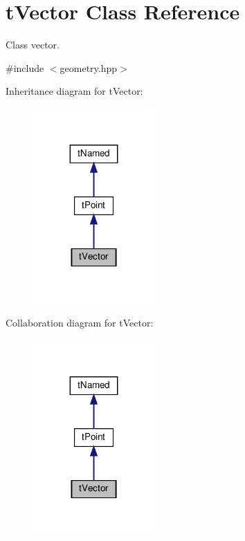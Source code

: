 \hypertarget{classtVector}{}\section{t\+Vector Class Reference}
\label{classtVector}


Class vector.  




{\ttfamily \#include $<$geometry.\+hpp$>$}



Inheritance diagram for t\+Vector\+:
\nopagebreak
\begin{figure}[H]
\begin{center}
\leavevmode
\includegraphics[width=131pt]{classtVector__inherit__graph}
\end{center}
\end{figure}


Collaboration diagram for t\+Vector\+:
\nopagebreak
\begin{figure}[H]
\begin{center}
\leavevmode
\includegraphics[width=131pt]{classtVector__coll__graph}
\end{center}
\end{figure}
